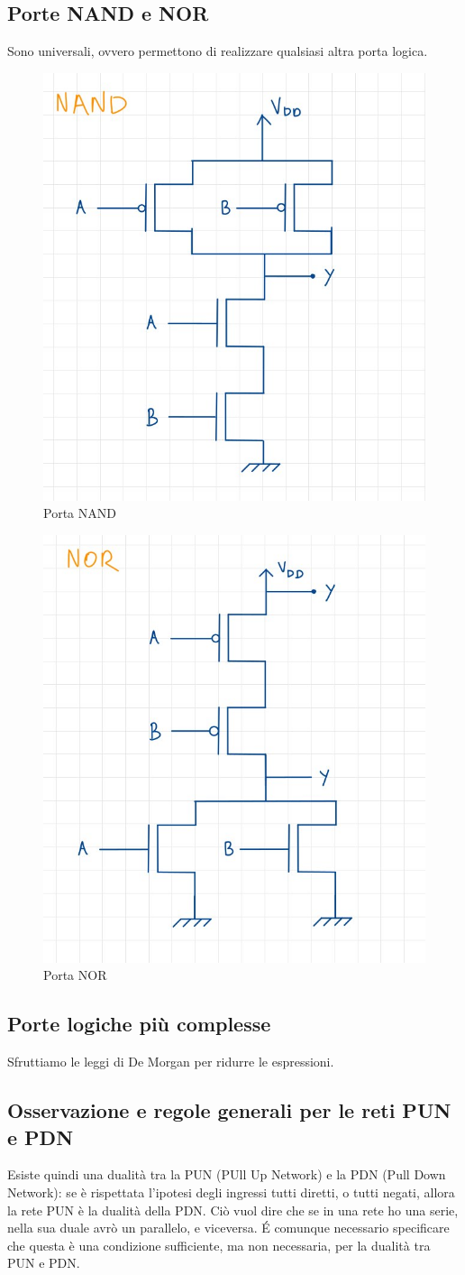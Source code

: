 \documentclass[11pt,a4paper,]{article}
\begin{document}
\subsection{Porte NAND e NOR}
Sono universali, ovvero permettono di realizzare qualsiasi altra porta logica.
\begin{figure}[H]
	\centering
	\includegraphics[width=0.4\linewidth]{"img/porta nand"}
	\caption{Porta NAND}
	\label{fig:porta-nand}
\end{figure}
\begin{figure}[H]
	\centering
	\includegraphics[width=0.4\linewidth]{"img/porta nor"}
	\caption{Porta NOR}
	\label{fig:porta-nor}
\end{figure}
\subsection{Porte logiche più complesse}
Sfruttiamo le leggi di De Morgan per ridurre le espressioni.
\subsection{Osservazione e regole generali per le reti PUN e PDN}
Esiste quindi una dualità tra la PUN (PUll Up Network) e la PDN (Pull Down Network): se è rispettata l’ipotesi degli ingressi tutti diretti, o tutti negati, allora la rete PUN è la dualità della PDN. Ciò vuol dire che se in una rete ho una serie, nella sua duale avrò un parallelo, e viceversa. É comunque necessario specificare che questa è una condizione sufficiente, ma non necessaria, per la dualità tra PUN e PDN.
\end{document}
